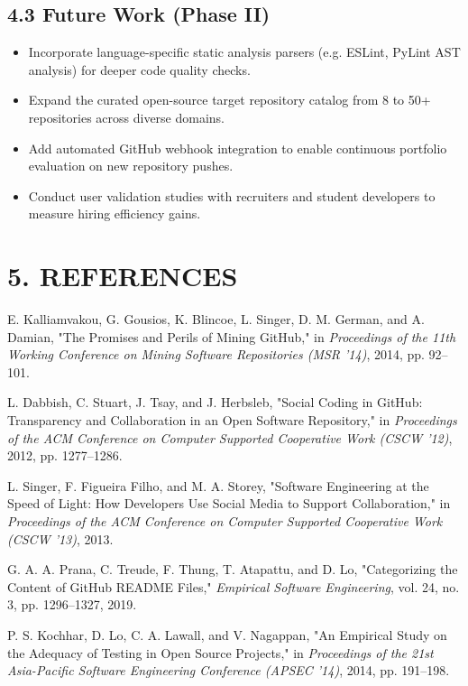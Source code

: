 \documentclass[12pt,a4paper]{article}
\begin{document}
\subsection{4.3 Future Work (Phase II)}
\begin{itemize}
    \item Incorporate language-specific static analysis parsers (e.g. ESLint, PyLint AST analysis) for deeper code quality checks.
    \item Expand the curated open-source target repository catalog from 8 to 50+ repositories across diverse domains.
    \item Add automated GitHub webhook integration to enable continuous portfolio evaluation on new repository pushes.
    \item Conduct user validation studies with recruiters and student developers to measure hiring efficiency gains.
\end{itemize}

\newpage
\thispagestyle{fancy}
\section{5. REFERENCES}

\noindent [1] E. Kalliamvakou, G. Gousios, K. Blincoe, L. Singer, D. M. German, and A. Damian, "The Promises and Perils of Mining GitHub," in \emph{Proceedings of the 11th Working Conference on Mining Software Repositories (MSR '14)}, 2014, pp. 92--101.

\noindent [2] L. Dabbish, C. Stuart, J. Tsay, and J. Herbsleb, "Social Coding in GitHub: Transparency and Collaboration in an Open Software Repository," in \emph{Proceedings of the ACM Conference on Computer Supported Cooperative Work (CSCW '12)}, 2012, pp. 1277--1286.

\noindent [3] L. Singer, F. Figueira Filho, and M. A. Storey, "Software Engineering at the Speed of Light: How Developers Use Social Media to Support Collaboration," in \emph{Proceedings of the ACM Conference on Computer Supported Cooperative Work (CSCW '13)}, 2013.

\noindent [4] G. A. A. Prana, C. Treude, F. Thung, T. Atapattu, and D. Lo, "Categorizing the Content of GitHub README Files," \emph{Empirical Software Engineering}, vol. 24, no. 3, pp. 1296--1327, 2019.

\noindent [5] P. S. Kochhar, D. Lo, C. A. Lawall, and V. Nagappan, "An Empirical Study on the Adequacy of Testing in Open Source Projects," in \emph{Proceedings of the 21st Asia-Pacific Software Engineering Conference (APSEC '14)}, 2014, pp. 191--198.
\end{document}
